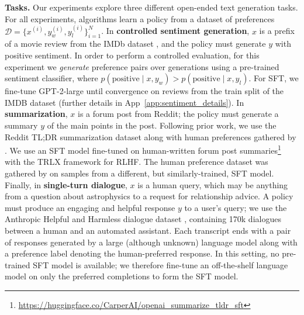 \textbf{Tasks.} Our experiments explore three different open-ended text generation tasks. For all experiments, algorithms learn a policy from a dataset of preferences $\mathcal{D}=\bigl\{x^{(i)}, y_w^{(i)}, y_l^{(i)}\bigr\}_{i=1}^N$. In \textbf{controlled sentiment generation}, $x$ is a prefix of a movie review from the IMDb dataset \cite{maas-EtAl:2011:ACL-HLT2011}, and the policy must generate $y$ with positive sentiment. In order to perform a controlled evaluation, for this experiment we \textit{generate} preference pairs over generations using a pre-trained sentiment classifier, where $p(\text{positive}\mid x,y_w)>p(\text{positive}\mid x,y_l)$. For SFT, we fine-tune GPT-2-large until convergence on reviews from the train split of the IMDB dataset (further details in App~\ref{app:sentiment_details}). In \textbf{summarization}, $x$ is a forum post from Reddit; the policy must generate a summary $y$ of the main points in the post. Following prior work, we use the Reddit TL;DR summarization dataset \citep{volske-etal-2017-tl} along with human preferences gathered by \citeauthor{stiennon2022learning}. We use an SFT model fine-tuned on human-written forum post summaries\footnote{\url{https://huggingface.co/CarperAI/openai_summarize_tldr_sft}} with the TRLX \citep{leandro_von_werra_2023_7790115} framework for RLHF. The human preference dataset was gathered by \citeauthor{stiennon2022learning} on samples from a different, but similarly-trained, SFT model. Finally, in \textbf{single-turn dialogue}, 
$x$ is a human query, which may be anything from a question about astrophysics to a request for relationship advice. A policy must produce an engaging and helpful response $y$ to a user's query; we use the Anthropic Helpful and Harmless dialogue dataset \citep{bai2022training}, containing 170k dialogues between a human and an automated assistant. Each transcript ends with a pair of responses generated by a large (although unknown) language model along with a preference label denoting the human-preferred response. In this setting, no pre-trained SFT model is available; we therefore fine-tune an off-the-shelf language model on only the preferred completions to form the SFT model.




